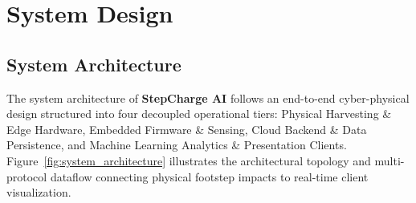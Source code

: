 \chapter{System Design}

\section{System Architecture}
The system architecture of \textbf{StepCharge AI} follows an end-to-end cyber-physical design structured into four decoupled operational tiers: Physical Harvesting \& Edge Hardware, Embedded Firmware \& Sensing, Cloud Backend \& Data Persistence, and Machine Learning Analytics \& Presentation Clients. Figure~\ref{fig:system_architecture} illustrates the architectural topology and multi-protocol dataflow connecting physical footstep impacts to real-time client visualization.

